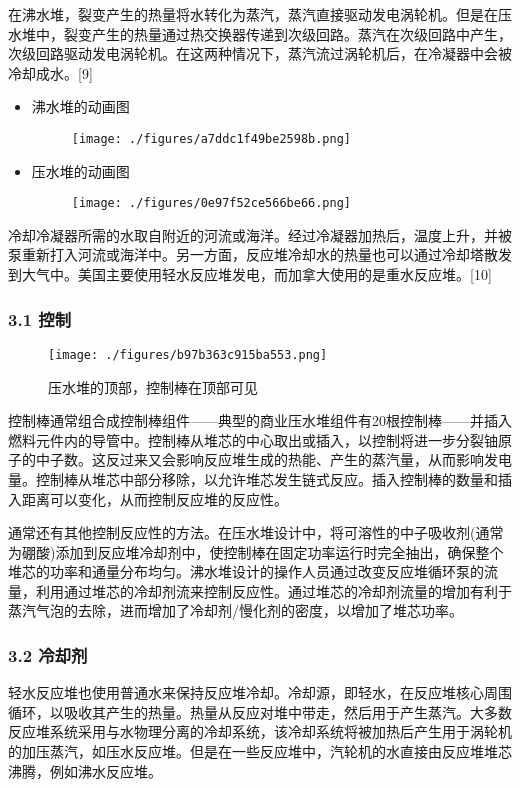 在沸水堆，裂变产生的热量将水转化为蒸汽，蒸汽直接驱动发电涡轮机。但是在压水堆中，裂变产生的热量通过热交换器传递到次级回路。蒸汽在次级回路中产生，次级回路驱动发电涡轮机。在这两种情况下，蒸汽流过涡轮机后，在冷凝器中会被冷却成水。[9]
\begin{itemize}
\item 沸水堆的动画图
\begin{figure}[ht]
\centering
\texttt{[image: ./figures/a7ddc1f49be2598b.png]}
\caption\label{fig_QSFYD_2}
\end{figure}

\item 压水堆的动画图
\begin{figure}[ht]
\centering
\texttt{[image: ./figures/0e97f52ce566be66.png]}
\caption\label{fig_QSFYD_3}
\end{figure}
\end{itemize}
冷却冷凝器所需的水取自附近的河流或海洋。经过冷凝器加热后，温度上升，并被泵重新打入河流或海洋中。另一方面，反应堆冷却水的热量也可以通过冷却塔散发到大气中。美国主要使用轻水反应堆发电，而加拿大使用的是重水反应堆。[10]

\subsubsection{3.1 控制}
\begin{figure}[ht]
\centering
\texttt{[image: ./figures/b97b363c915ba553.png]}
\caption{压水堆的顶部，控制棒在顶部可见} \label{fig_QSFYD_4}
\end{figure}
控制棒通常组合成控制棒组件——典型的商业压水堆组件有20根控制棒——并插入燃料元件内的导管中。控制棒从堆芯的中心取出或插入，以控制将进一步分裂铀原子的中子数。这反过来又会影响反应堆生成的热能、产生的蒸汽量，从而影响发电量。控制棒从堆芯中部分移除，以允许堆芯发生链式反应。插入控制棒的数量和插入距离可以变化，从而控制反应堆的反应性。

通常还有其他控制反应性的方法。在压水堆设计中，将可溶性的中子吸收剂(通常为硼酸)添加到反应堆冷却剂中，使控制棒在固定功率运行时完全抽出，确保整个堆芯的功率和通量分布均匀。沸水堆设计的操作人员通过改变反应堆循环泵的流量，利用通过堆芯的冷却剂流来控制反应性。通过堆芯的冷却剂流量的增加有利于蒸汽气泡的去除，进而增加了冷却剂/慢化剂的密度，以增加了堆芯功率。

\subsubsection{3.2 冷却剂}
轻水反应堆也使用普通水来保持反应堆冷却。冷却源，即轻水，在反应堆核心周围循环，以吸收其产生的热量。热量从反应对堆中带走，然后用于产生蒸汽。大多数反应堆系统采用与水物理分离的冷却系统，该冷却系统将被加热后产生用于涡轮机的加压蒸汽，如压水反应堆。但是在一些反应堆中，汽轮机的水直接由反应堆堆芯沸腾，例如沸水反应堆。

